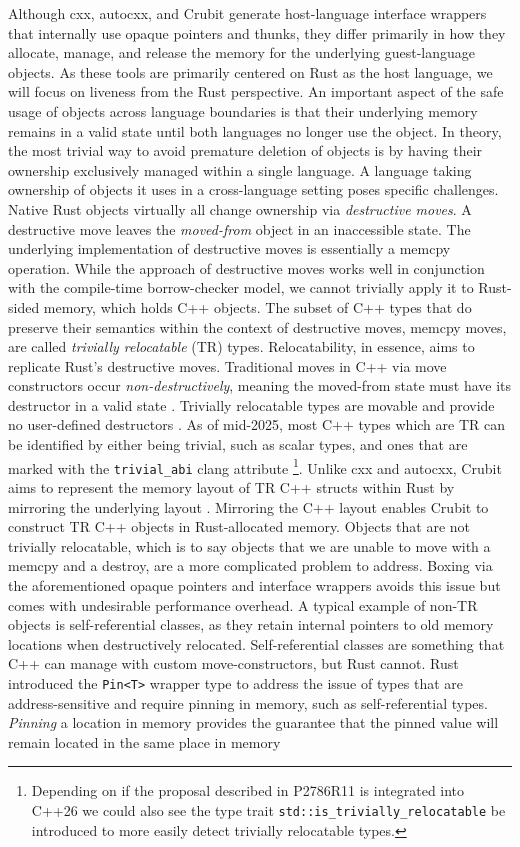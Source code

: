 Although cxx, autocxx, and Crubit generate host-language interface wrappers that internally use opaque pointers and thunks, they differ primarily in how they allocate, manage, and release the memory for the underlying guest-language objects. As these tools are primarily centered on Rust as the host language, we will focus on liveness from the Rust perspective. An important aspect of the safe usage of objects across language boundaries is that their underlying memory remains in a valid state until both languages no longer use the object. In theory, the most trivial way to avoid premature deletion of objects is by having their ownership exclusively managed within a single language. A language taking ownership of objects it uses in a cross-language setting poses specific challenges. Native Rust objects virtually all change ownership via \textit{destructive moves}. A destructive move leaves the \textit{moved-from} object in an inaccessible state. The underlying implementation of destructive moves is essentially a memcpy operation. While the approach of destructive moves works well in conjunction with the compile-time borrow-checker model, we cannot trivially apply it to Rust-sided memory, which holds C++ objects. The subset of C++ types that do preserve their semantics within the context of destructive moves, \ie memcpy moves, are called \textit{trivially relocatable} (TR) types. Relocatability, in essence, aims to replicate Rust's destructive moves. Traditional moves in C++ via move constructors occur \textit{non-destructively}, meaning the moved-from state must have its destructor in a valid state \cite{hartzell2021cppmove}. Trivially relocatable types are movable and provide no user-defined destructors \cite{p1144r13}. As of mid-2025, most C++ types which are TR can be identified by either being trivial, such as scalar types, and ones that are marked with the \texttt{trivial\_abi} clang attribute \cite{clang-trivial-abi, crubit-cxx-design} \footnote{Depending on if the proposal described in P2786R11 \cite{p2786r11} is integrated into C++26 we could also see the type trait \texttt{std::is\_trivially\_relocatable} be introduced to more easily detect trivially relocatable types.}. Unlike cxx and autocxx, Crubit aims to represent the memory layout of TR C++ structs within Rust by mirroring the underlying layout \cite{crubit-struct-layout}. Mirroring the C++ layout enables Crubit to construct TR C++ objects in Rust-allocated memory. Objects that are not trivially relocatable, which is to say objects that we are unable to move with a memcpy and a destroy, are a more complicated problem to address. Boxing via the aforementioned opaque pointers and interface wrappers avoids this issue but comes with undesirable performance overhead. A typical example of non-TR objects is self-referential classes, as they retain internal pointers to old memory locations when destructively relocated. Self-referential classes are something that C++ can manage with custom move-constructors, but Rust cannot. Rust introduced the \texttt{Pin<T>} wrapper type to address the issue of types that are address-sensitive and require pinning in memory, such as self-referential types. \textit{Pinning} a location in memory provides the guarantee that the pinned value will remain located in the same place in memory 
